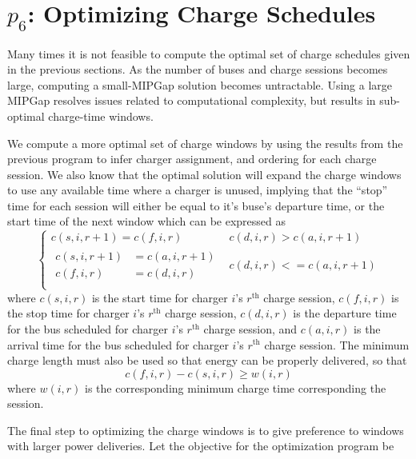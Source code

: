 \section{$p_6$: Optimizing Charge Schedules\label{sec:optimizingChargeSchedules}}
Many times it is not feasible to compute the optimal set of charge schedules given in the previous sections. As the number of buses and charge sessions becomes large, computing a small-MIPGap solution becomes untractable. Using a large MIPGap resolves issues related to computational complexity, but results in sub-optimal charge-time windows.
\par We compute a more optimal set of charge windows by using the results from the previous program to infer charger assignment, and ordering for each charge session. We also know that the optimal solution will expand the charge windows to use any available time where a charger is unused, implying that the ``stop'' time for each session will either be equal to it's buse's departure time, or the start time of the next window which can be expressed as
\begin{equation}\label{eqn:optChargeSchedules:eqn1}
\begin{cases}
	c(s,i,r+1) = c(f,i,r) & c(d,i,r) > c(a,i,r+1)\\[0.08in]
	\begin{aligned}
	c(s,i,r+1) &= c(a,i,r+1) \\
	c(f,i,r) &= c(d,i,r)
	\end{aligned} & c(d,i,r) <= c(a,i,r+1) \\
\end{cases}
\end{equation}
where $c(s,i,r)$ is the start time for charger $i$'s $r^{\text{th}}$ charge session, $c(f,i,r)$ is the stop time for charger $i$'s $r^{\text{th}}$ charge session, $c(d,i,r)$ is the departure time for the bus scheduled for charger $i$'s $r^{\text{th}}$ charge session, and $c(a,i,r)$ is the arrival time for the bus scheduled for charger $i$'s $r^{\text{th}}$ charge session. 
The minimum charge length must also be used so that energy can be properly delivered, so that
\begin{equation}\label{eqn:optChargeSchedules:eqn2}
	c(f,i,r) - c(s,i,r) \ge w(i,r)
\end{equation}
where $w(i,r)$ is the corresponding minimum charge time corresponding the session.
\par The final step to optimizing the charge windows is to give preference to windows with larger power deliveries. Let the objective for the optimization program be 
